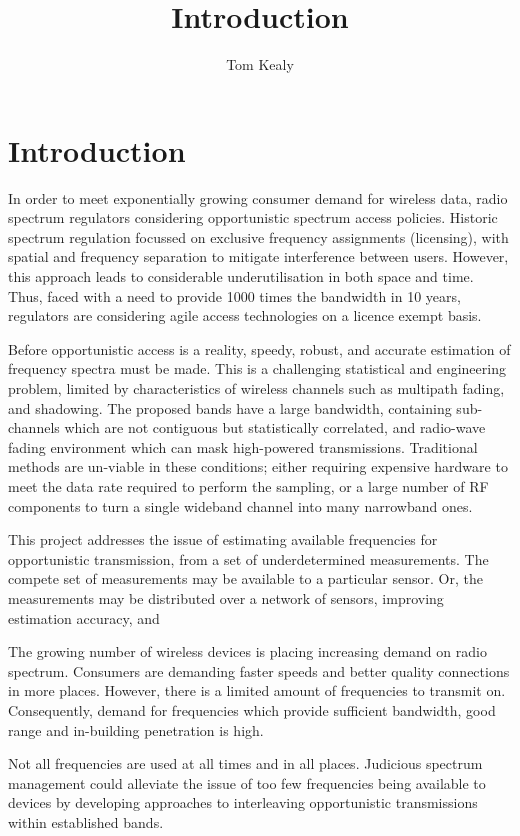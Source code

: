 \documentclass{article}
\title{Introduction}
\author{Tom Kealy}
\begin{document}
\maketitle

\section{Introduction}

In order to meet exponentially growing consumer demand for wireless data, radio spectrum regulators considering opportunistic spectrum access policies. Historic spectrum regulation focussed on exclusive frequency assignments (licensing), with spatial and frequency separation to mitigate interference between users. However, this approach leads to considerable underutilisation in both space and time. Thus, faced with a need to provide 1000 times the bandwidth in 10 years, regulators are considering agile access technologies on a licence exempt basis.

Before opportunistic access is a reality, speedy, robust, and accurate estimation of frequency spectra must be made. This is a challenging statistical and engineering problem, limited by characteristics of wireless channels such as multipath fading, and shadowing. The proposed bands have a large bandwidth, containing sub-channels which are not contiguous but statistically correlated, and radio-wave fading environment which can mask high-powered transmissions. Traditional methods are un-viable in these conditions; either requiring expensive hardware to meet the data rate required to perform the sampling, or a large number of RF components to turn a single wideband channel into many narrowband ones.

This project addresses the issue of estimating available frequencies for opportunistic transmission, from a set of underdetermined measurements. The compete set of measurements may be available to a particular sensor. Or, the measurements may be distributed over a network of sensors, improving estimation accuracy, and 

The growing number of wireless devices is placing increasing demand on radio spectrum. Consumers are demanding faster speeds and better quality connections in more places. However, there is a limited amount of frequencies to transmit on. Consequently, demand for frequencies which provide sufficient bandwidth, good range and in-building penetration is high.

Not all frequencies are used at all times and in all places. Judicious spectrum management could alleviate the issue of too few frequencies being available to devices by developing approaches to interleaving opportunistic transmissions within established bands. 
\end{document}
